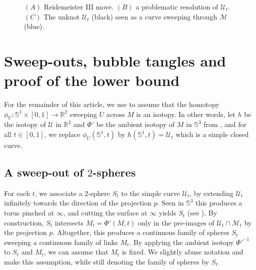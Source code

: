 \documentclass{article}
\newcommand{\R}{\mathbb{R}}
\newcommand{\Sp}{\mathbb{S}}
\begin{document}
\begin{figure}
\begin{center}
\caption{$(A)$ Reidemeister III move. $(B)$ a problematic resolution of $\mathcal{U}_t$. $(C)$ The unknot $\mathcal{U}_t$ (black) seen as a curve sweeping through $\mathcal{M}$ (blue).}
\label{pic_reidemeister_issues}
\end{center}
\end{figure}

\section{Sweep-outs, bubble tangles and proof of the lower bound}\label{sec_tangle}

For the remainder of this article, we use  to assume that the homotopy $\phi_U : \Sp^1 \times [0,1] \to \R^2$ sweeping $U$ across $M$ is an isotopy.
In other words, let $h$ be the isotopy of $\mathcal{U}$ in $\R^2$ and $\Phi'$ be the ambient isotopy of $M$ in $\Sp^3$ from , and for all $t \in [0,1]$, we replace $\phi_U (\Sp^1, t)$ by $h (\Sp^1, t) = \mathcal{U}_t$ which is a simple closed curve.

\subsection{A sweep-out of $2$-spheres}
\label{sec:sweepout}

For each $t$, we associate a $2$-sphere $S_t$ to the simple curve $\mathcal{U}_t$, by extending $\mathcal{U}_t$ infinitely towards the direction of the projection $p$. Seen in $\Sp^3$ this produces a torus pinched at $\infty$, and cutting the surface at $\infty$ yields $S_t$ (see ). By construction, $S_t$ intersects $M_t = \Phi'(M,t)$ only in the pre-images of $\mathcal{U}_t \cap \mathcal{M}_t$ by the projection $p$. Altogether, this produces a continuous family of spheres $S_t$ sweeping a continuous family of links $M_t$. By applying the ambient isotopy $\Phi'^{-1}$ to $S_t$ and $M_t$, we can assume that $M_t$ is fixed. We slightly abuse notation and make this assumption, while still denoting the family of spheres by $S_t$. 
\end{document}
